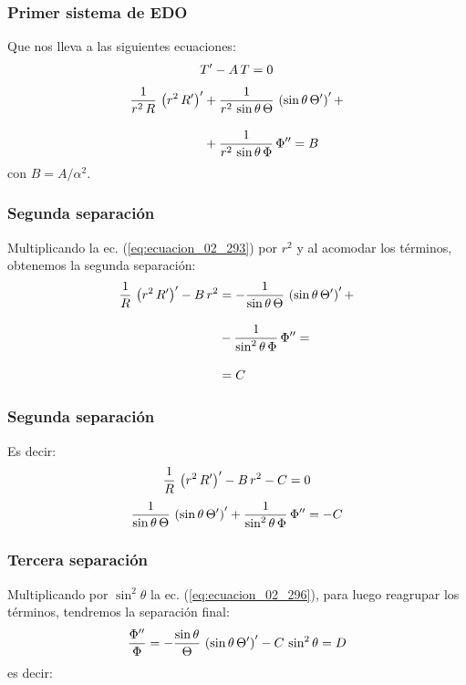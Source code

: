 \documentclass[12pt]{beamer}
\begin{document}
\begin{frame}
\frametitle{Primer sistema de EDO}
Que nos lleva a las siguientes ecuaciones:
\begin{align}
{T}^{\prime} - A \, T = 0
\label{eq:ecuacion_02_292}
\end{align}
\begin{align}
\begin{aligned}
\dfrac{1}{r^{2} \, R} \, \left( r^{2} \, {R}^{\prime} \right)^{\prime} &+ \dfrac{1}{r^{2} \, \sin \theta \, \Theta} \, \left( \sin \theta \, {\Theta}^{\prime} \right)^{\prime} + \\[1em]
&+ \dfrac{1}{r^{2} \, \sin \theta \, \Phi} \, {\Phi}^{\prime \prime} = B
\end{aligned}
\label{eq:ecuacion_02_293}
\end{align}
con $B = A / \alpha^{2}$.
\end{frame}
\begin{frame}
\frametitle{Segunda separación}
Multiplicando la ec. (\ref{eq:ecuacion_02_293}) por $r^{2}$ y al acomodar los términos, obtenemos la segunda separación:
\begin{align}
\begin{aligned}
\dfrac{1}{R} \, \left( r^{2} \, {R}^{\prime} \right)^{\prime} - B \, r^{2} &=  - \dfrac{1}{\sin \theta \, \Theta} \, \left( \sin \theta \, {\Theta}^{\prime} \right)^{\prime} + \\[1em]
&- \dfrac{1}{\sin^{2} \theta \, \Phi} \, {\Phi}^{\prime \prime} = \\[1em]
&= C
\end{aligned}
\label{eq:ecuacion_02_294}
\end{align}
\end{frame}
\begin{frame}
\frametitle{Segunda separación}
Es decir:
\begin{align}
\dfrac{1}{R} \, \left( r^{2} \, {R}^{\prime} \right)^{\prime} - B \, r^{2} - C = 0
\label{eq:ecuacion_02_295}
\end{align}
\begin{align}
\dfrac{1}{\sin \theta \, \Theta} \, \left( \sin \theta \, {\Theta}^{\prime} \right)^{\prime} + \dfrac{1}{\sin^{2} \theta \, \Phi} \, {\Phi}^{\prime \prime} = - C
\label{eq:ecuacion_02_296}
\end{align}
\end{frame}
\begin{frame}
\frametitle{Tercera separación}
Multiplicando por $\sin^{2} \theta$ la ec. (\ref{eq:ecuacion_02_296}), para luego reagrupar los términos, tendremos la separación final:
\begin{align}
\dfrac{{\Phi}^{\prime \prime}}{\Phi} = - \dfrac{\sin \theta}{\Theta} \, \left( \sin \theta \, {\Theta}^{\prime} \right)^{\prime} - C \, \sin^{2} \theta = D
\label{eq:ecuacion_02_297}
\end{align}
es decir:
\end{frame}
\end{document}
